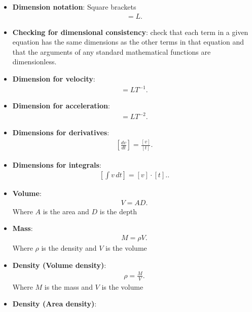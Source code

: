 \documentclass{report}
\begin{document}
\begin{itemize}
        \item \textbf{Dimension notation}: Square brackets
            \begin{align*}
                [r] = L
            .\end{align*}
        \item \textbf{Checking for dimensional consistency}: 
            check that each term in a given equation has the same dimensions as the other terms in that equation and that the arguments of any standard mathematical functions are dimensionless.
        \item \textbf{Dimension for velocity}:
            \begin{align*}
                [v] = LT^{-1}
            .\end{align*}
        \item \textbf{Dimension for acceleration}:
            \begin{align*}
                [a] = LT^{-2}
            .\end{align*}
        \item \textbf{Dimensions for derivatives}:
            \begin{align*}
                \left[\frac{dv}{dt}\right] = \frac{[v]}{[t]}
            .\end{align*}
        \item \textbf{Dimensions for integrals}:
            \begin{align*}
                \left[ \int v \, dt \right] = [v] \cdot [t].
            .\end{align*}
        \item \textbf{Volume}:
            \begin{align*}
                V = AD
            .\end{align*}
            Where $A$ is the area and $D$ is the depth
        \item \textbf{Mass}:
            \begin{align*}
                M = \rho V
            .\end{align*}
            Where $\rho$ is the density and $V$ is the volume
        \item \textbf{Density (Volume density)}:
            \begin{align*}
                \rho = \frac{M}{V}
            .\end{align*}
            Where $M$ is the mass and $V$ is the volume
        \item \textbf{Density (Area density)}:
            \begin{align*}

\end{align*}
\end{itemize}
\end{document}
